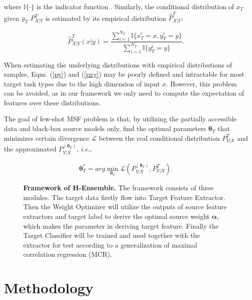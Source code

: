 \documentclass[letterpaper]{article} %
\begin{document}
\noindent where $\mathbb{I}\{\cdot\}$ is the indicator function \citep{feller1991introduction}. Similarly, the conditional distribution of $x_T$ given $y_T$ $P^T_{X|Y}$ is estimated by its empirical distribution $\hat P^T_{X|Y}$:

\begin{equation}
\hat P^T_{X|Y} (x|y)= \frac{\sum_{i=1}^{N_T}\mathbb{I}\{x_T^i=x,y_T^i=y\}}{\sum_{i=1}^{N_T}\mathbb{I}\{y_T^i=y\}}.
\label{pxy}
\end{equation}

When estimating the underlying distributions with empirical distributions of samples, Eqns. (\ref{py}) and (\ref{pxy}) may be poorly defined and intractable for most target task types due to the high dimension of input $x$. However, this problem can be avoided, as in our framework we only need to compute the expectation of features over these distributions.

The goal of few-shot MSF problem is that, by utilizing the partially accessible data and black-box source models only, find the optimal parameters $\boldsymbol{\theta}_T$ that minimizes certain divergence $\mathcal L$ between the real conditional distribution $P^T_{Y|X}$ and the approximated $P^{(\boldsymbol{\theta}_T)}_{Y|X}$, \textit{i.e.},

\begin{equation}
    \boldsymbol{\theta}^*_T = arg\min_{\boldsymbol{\theta}_T} \mathcal L(P^{(\boldsymbol{\theta}_T)}_{Y|X}, P^T_{Y|X}).
    \label{definition}
\end{equation}

\begin{figure*}
    \centering
    \centerline{}
    \caption{\textbf{Framework of H-Ensemble.} The framework consists of three modules. The target data firstly flow into Target Feature Extractor. Then the Weight Optimizer will utilize the outputs of source feature extractors and target label to derive the optimal source weight $\boldsymbol{\alpha}$, which makes the parameter in deriving target feature. Finally the Target Classifier will be trained and used together with the extractor for test according to a generalization of maximal correlation regression (MCR).}
    \label{fig:framework}
\end{figure*}



\section{Methodology}
\end{document}
